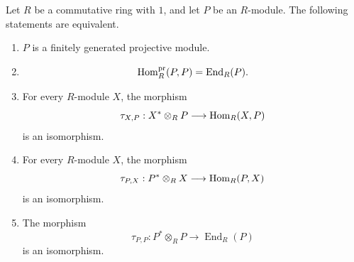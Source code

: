 \begin{theorem}
    Let $R$ be a commutative ring with $1$, and let $P$ be an $R$-module. The following
    statements are equivalent.
    \begin{enumerate}
        \item $P$ is a finitely generated projective module.
        \item
              \[
                  \mathrm{Hom}_R^{\operatorname{pr}}(P,P)=\operatorname{End}_R(P).
              \]
        \item For every $R$-module $X$, the morphism
              \[
                  \tau_{X,P}:X^*\otimes_R P\longrightarrow \mathrm{Hom}_R(X,P)
              \]
              is an isomorphism.
        \item For every $R$-module $X$, the morphism
              \[
                  \tau_{P,X}:P^*\otimes_R X\longrightarrow \mathrm{Hom}_R(P,X)
              \]
              is an isomorphism.
        \item The morphism
              \[
                  \tau_{P,P}:P^*\otimes_R P\longrightarrow \operatorname{End}_R(P)
              \]
              is an isomorphism.
    \end{enumerate}
\end{theorem}

